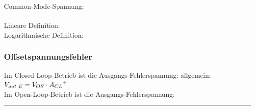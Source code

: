 			\begin{minipage}{18cm}
            	Common-Mode-Spannung:
            	\\
            	\hspace*{4.2cm}\\
            	Lineare Definition: \hspace{11mm}
            	\hspace{11mm}
            	\\
            	Logarithmische Definition:
            	\\
            \end{minipage}

\newpage
		
		\subsubsection{Offsetspannungsfehler }
			\begin{minipage}{18cm}
            	Im Closed-Loop-Betrieb ist die Ausgangs-Fehlerspannung:\hspace{6mm}
            	 allgemein: $V_{out \hspace{1mm}E}=V_{OS}
            	\cdot {A_{CL}}^{+}$\\
            	Im Open-Loop-Betrieb ist die Ausgangs-Fehlerspannung:\hspace{6mm}
            	\\
            \end{minipage}

\hrule
		
